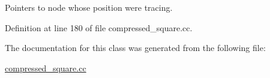 Pointers to node whose position we\textquotesingle{}re tracing. 



Definition at line 180 of file compressed\+\_\+square.\+cc.



The documentation for this class was generated from the following file\+:\begin{DoxyCompactItemize}
\item 
\hyperlink{compressed__square_8cc}{compressed\+\_\+square.\+cc}\end{DoxyCompactItemize}
